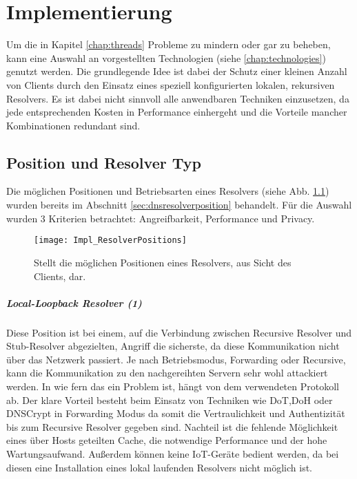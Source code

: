 \chapter{Implementierung}
\label{chap:implementation}

Um die in Kapitel \ref{chap:threads} Probleme zu mindern oder gar zu beheben, kann eine Auswahl an vorgestellten Technologien (siehe \ref{chap:technologies}) genutzt werden. Die grundlegende Idee ist dabei der Schutz einer kleinen Anzahl von Clients durch den Einsatz eines speziell konfigurierten lokalen, rekursiven Resolvers. Es ist dabei nicht sinnvoll alle anwendbaren Techniken einzusetzen, da jede entsprechenden Kosten in Performance einhergeht und die Vorteile mancher Kombinationen redundant sind.

\section{Position und Resolver Typ}
Die möglichen Positionen und Betriebsarten eines Resolvers (siehe Abb. \ref{img:impl-resolverpositions}) wurden bereits im Abschnitt \ref{sec:dnsresolverposition} behandelt. Für die Auswahl wurden 3 Kriterien betrachtet: Angreifbarkeit, Performance und Privacy.
\begin{figure}[hb]
    \centering
    \texttt{[image: Impl\_ResolverPositions]}
    \caption{Stellt die möglichen Positionen eines Resolvers, aus Sicht des Clients, dar.}
    \label{img:impl-resolverpositions}
\end{figure}

\paragraph{Local-Loopback Resolver (1)}
Diese Position ist bei einem, auf die Verbindung zwischen Recursive Resolver und Stub-Resolver abgezielten, Angriff die sicherste, da diese Kommunikation nicht über das Netzwerk passiert. Je nach Betriebsmodus, Forwarding oder Recursive, kann die Kommunikation zu den nachgereihten Servern sehr wohl attackiert werden. In wie fern das ein Problem ist, hängt von dem verwendeten Protokoll ab. Der klare Vorteil besteht beim Einsatz von Techniken wie DoT,DoH oder DNSCrypt in Forwarding Modus da somit die Vertraulichkeit und Authentizität bis zum Recursive Resolver gegeben sind. Nachteil ist die fehlende Möglichkeit eines über Hosts geteilten Cache, die notwendige Performance und der hohe Wartungsaufwand. Außerdem können keine IoT-Geräte bedient werden, da bei diesen eine Installation eines lokal laufenden Resolvers nicht möglich ist.

